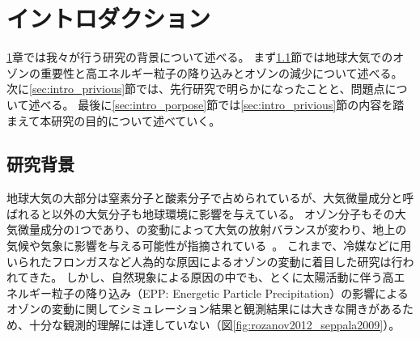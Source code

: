 \chapter{イントロダクション}
\label{ch:intro}
\ref{ch:intro}章では我々が行う研究の背景について述べる。
まず\ref{sec:intro_background}節では地球大気でのオゾンの重要性と高エネルギー粒子の降り込みとオゾンの減少について述べる。
次に\ref{sec:intro_privious}節では、先行研究で明らかになったことと、問題点について述べる。
最後に\ref{sec:intro_porpose}節では\ref{sec:intro_privious}節の内容を踏まえて本研究の目的について述べていく。


\section{研究背景}
\label{sec:intro_background}
地球大気の大部分は窒素分子と酸素分子で占められているが、大気微量成分と呼ばれると以外の大気分子も地球環境に影響を与えている。
オゾン分子もその大気微量成分の1つであり、の変動によって大気の放射バランスが変わり、地上の気候や気象に影響を与える可能性が指摘されている~\cite{rozanov2012influence,seppala2009geomagnetic}。
これまで、冷媒などに用いられたフロンガスなど人為的な原因によるオゾンの変動に着目した研究は行われてきた。
しかし、自然現象による原因の中でも、とくに太陽活動に伴う高エネルギー粒子の降り込み（EPP: Energetic Particle Precipitation）の影響によるオゾンの変動に関してシミュレーション結果と観測結果には大きな開きがあるため、十分な観測的理解には達していない（図\ref{fig:rozanov2012_seppala2009}）。
